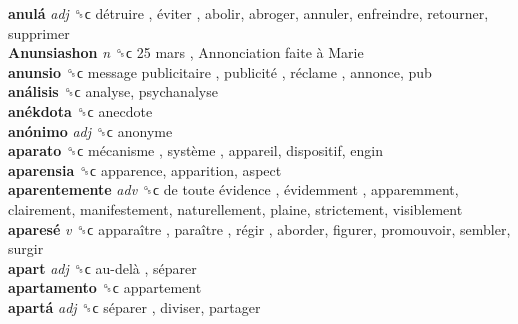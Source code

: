 \textbf{anulá} \emph{adj}  ␝ϲ   détruire ,  éviter , abolir, abroger, annuler, enfreindre, retourner, supprimer  \\
\textbf{Anunsiashon} \emph{n}  ␝ϲ   25 mars ,  Annonciation faite à Marie   \\
\textbf{anunsio} ␝ϲ   message publicitaire ,  publicité ,  réclame , annonce, pub  \\
\textbf{análisis} ␝ϲ  analyse, psychanalyse  \\
\textbf{anékdota} ␝ϲ  anecdote  \\
\textbf{anónimo} \emph{adj}  ␝ϲ  anonyme  \\
\textbf{aparato} ␝ϲ   mécanisme ,  système , appareil, dispositif, engin  \\
\textbf{aparensia} ␝ϲ  apparence, apparition, aspect  \\
\textbf{aparentemente} \emph{adv}  ␝ϲ   de toute évidence ,  évidemment , apparemment, clairement, manifestement, naturellement, plaine, strictement, visiblement  \\
\textbf{aparesé} \emph{v}  ␝ϲ   apparaître ,  paraître ,  régir , aborder, figurer, promouvoir, sembler, surgir  \\
\textbf{apart} \emph{adj}  ␝ϲ   au-delà ,  séparer   \\
\textbf{apartamento} ␝ϲ  appartement  \\
\textbf{apartá} \emph{adj}  ␝ϲ   séparer , diviser, partager  \\
